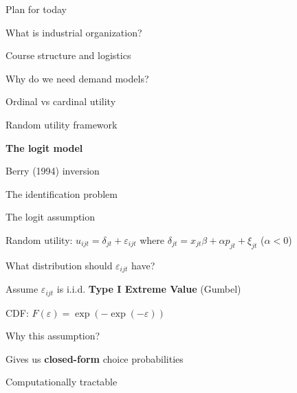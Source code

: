 \documentclass[notes,11pt, aspectratio=169]{beamer}
\newenvironment{wideitemize}{\itemize\addtolength{\itemsep}{10pt}}{\enditemize}
\newenvironment{wideenumerate}{\enumerate\addtolength{\itemsep}{10pt}}{\endenumerate}
\begin{document}

\begin{frame}{Plan for today}
  \begin{wideenumerate}
    \item What is industrial organization?
    \item Course structure and logistics
    \item Why do we need demand models?
    \item Ordinal vs cardinal utility
    \item Random utility framework
    \item \textbf{The logit model}
    \item Berry (1994) inversion
    \item The identification problem
  \end{wideenumerate}
\end{frame}

\begin{frame}{The logit assumption}
	\begin{wideitemize}
		\item Random utility: $u_{ijt} = \delta_{jt} + \varepsilon_{ijt}$ where $\delta_{jt} = x_{jt} \beta + \alpha p_{jt} + \xi_{jt}$ \quad ($\alpha < 0$)
		\item What distribution should $\varepsilon_{ijt}$ have?
		\item Assume $\varepsilon_{ijt}$ is i.i.d. \textbf{Type I Extreme Value} (Gumbel)
		\item CDF: $F(\varepsilon) = \exp(-\exp(-\varepsilon))$
		\item Why this assumption?
		\begin{wideitemize}
			\vspace{5pt}
			\item Gives us \textbf{closed-form} choice probabilities
			\item Computationally tractable
		\end{wideitemize}
	\end{wideitemize}
\end{frame}
\end{document}
